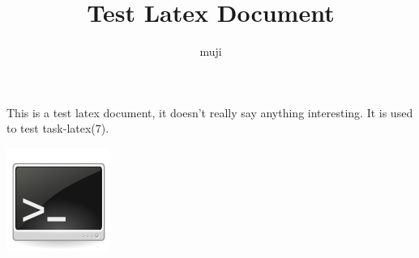 \documentclass[a4paper,oneside,twocolumns]{article}
\title{Test Latex Document}
\author{muji}
\renewcommand{\paragraph}{\large}
\begin{document}
\fancyhead{}
\fancyfoot{}

\lfoot{\thepage}

\clearpage

%
%

\paragraph{\normalsize{This is a test latex document, it doesn't really say anything interesting. It is used to test task-latex(7).}}

\includegraphics[scale=1]{images/terminal-icon.png}
\end{document}
